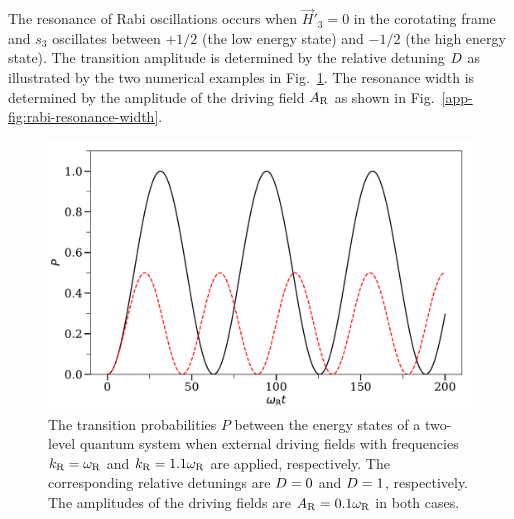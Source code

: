 The resonance of Rabi oscillations occurs when $\vec{H}'_3=0$ in the corotating frame and $s_3$ oscillates between $+1/2$ (the low energy state) and $-1/2$ (the high energy state). The transition amplitude is determined by the relative detuning $D$ as illustrated by the two numerical examples in Fig.~\ref{app-fig:rabi-examples}. The resonance width is determined by the amplitude of the driving field $A_\mathrm R$ as shown in Fig.~\ref{app-fig:rabi-resonance-width}.

\begin{figure}[htbp]
    \centering
    \includegraphics[width=\textwidth]{chapters/assets/app/rabi-oscillations}
    \caption{The transition probabilities $P$ between the energy states of a two-level quantum system when external driving fields with frequencies $k_\mathrm R = \omega_\mathrm R$ and $k_\mathrm R=1.1\omega_\mathrm R$ are applied, respectively. The corresponding relative detunings are $D = 0$ and $D = 1$, respectively. The amplitudes of the driving fields are $A_\mathrm R=0.1\omega_\mathrm R$ in both cases. }
    \label{app-fig:rabi-examples}
\end{figure}



